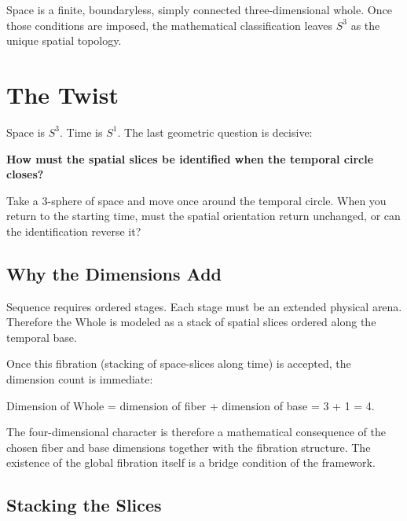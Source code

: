 \documentclass[11pt]{article}
\theoremstyle{canonstyle}
\providecommand{\Sone}{S^1}
\providecommand{\Sthree}{S^3}
\begin{document}
\begin{plainwords}
Space is a finite, boundaryless, simply connected three-dimensional whole. Once those conditions are imposed, the mathematical classification leaves $S^3$ as the unique spatial topology.
\end{plainwords}

\newpage
\section{The Twist}

Space is $\Sthree$. Time is $\Sone$. The last geometric question is decisive:

\begin{center}
\textbf{How must the spatial slices be identified when the temporal circle closes?}
\end{center}

\begin{reflect}
Take a 3-sphere of space and move once around the temporal circle. When you return to the starting time, must the spatial orientation return unchanged, or can the identification reverse it?
\end{reflect}

\subsection{Why the Dimensions Add}

Sequence requires ordered stages. Each stage must be an extended physical arena. Therefore the Whole is modeled as a stack of spatial slices ordered along the temporal base.

Once this fibration (stacking of space-slices along time) is accepted, the dimension count is immediate:

\begin{center}
Dimension of Whole = dimension of fiber + dimension of base = 3 + 1 = 4.
\end{center}

The four-dimensional character is therefore a mathematical consequence of the chosen fiber and base dimensions together with the fibration structure. The existence of the global fibration itself is a bridge condition of the framework.

\subsection{Stacking the Slices}
\end{document}
